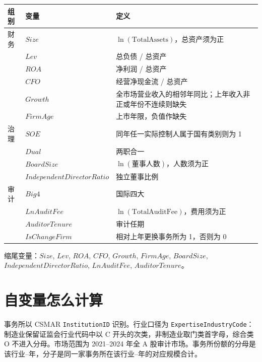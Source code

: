 \documentclass[11pt]{article}
\begin{document}
\begin{center}
\begin{threeparttable}
\caption{全部控制变量}
\begin{tabular}{llp{8.6cm}}
\toprule
组别 & 变量 & 定义 \\
\midrule
财务 & \(Size\) & \(\ln(\text{TotalAssets})\)，总资产须为正 \\
 & \(Lev\) & 总负债 / 总资产 \\
 & \(ROA\) & 净利润 / 总资产 \\
 & \(CFO\) & 经营净现金流 / 总资产 \\
 & \(Growth\) & 全市场营业收入的相邻年同比；上年收入非正或年份不连续则缺失 \\
 & \(FirmAge\) & 上市年限，负值作缺失 \\
治理 & \(SOE\) & 同年任一实际控制人属于国有类别则为 1 \\
 & \(Dual\) & 两职合一 \\
 & \(BoardSize\) & \(\ln(\text{董事人数})\)，人数须为正 \\
 & \(IndependentDirectorRatio\) & 独立董事比例 \\
审计 & \(Big4\) & 国际四大 \\
 & \(LnAuditFee\) & \(\ln(\text{TotalAuditFee})\)，费用须为正 \\
 & \(AuditorTenure\) & 审计任期 \\
 & \(IsChangeFirm\) & 相对上年更换事务所为 1，否则为 0 \\
\bottomrule
\end{tabular}
\begin{tablenotes}\footnotesize
\item 缩尾变量：\(Size\), \(Lev\), \(ROA\), \(CFO\), \(Growth\), \(FirmAge\), \(BoardSize\), \(IndependentDirectorRatio\), \(LnAuditFee\), \(AuditorTenure\)。
\end{tablenotes}
\end{threeparttable}
\end{center}

\section{自变量怎么计算}
\label{sec:x}

事务所以 CSMAR \texttt{InstitutionID} 识别。行业口径为 \texttt{ExpertiseIndustryCode}：制造业保留证监会行业代码中以 C 开头的次类，非制造业取门类首字母，综合类 O 不进入分母。市场范围为 2021--2024 年全 A 股审计市场。事务所份额的分母是该行业--年，分子是同一家事务所在该行业--年的对应规模合计。
\end{document}
